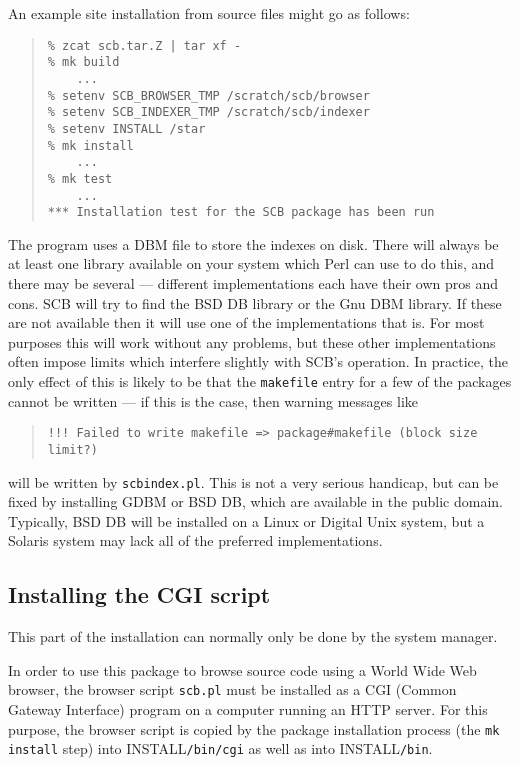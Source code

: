 \documentclass[twoside,11pt]{article}
\newcommand{\xlabel}[1]{}
\renewcommand{\_}{\texttt{\symbol{95}}}
\begin{document}
An example site installation from source files might go as follows:
\begin{quote}
\begin{verbatim}
% zcat scb.tar.Z | tar xf -
% mk build
    ...
% setenv SCB_BROWSER_TMP /scratch/scb/browser
% setenv SCB_INDEXER_TMP /scratch/scb/indexer
% setenv INSTALL /star
% mk install
    ...
% mk test
    ...
*** Installation test for the SCB package has been run
\end{verbatim}
\end{quote}

The program uses a DBM file to store the indexes on disk.
There will always be at least one library available on your system
which Perl can use to do this, and there may be
several --- different implementations each have their own pros and cons.
SCB will try to find
the BSD DB library or the Gnu DBM library.
If these are not available then it will use one of the implementations
that is.  For most purposes this will work without any problems, but
these other implementations often impose limits which interfere slightly
with SCB's operation.
In practice, the only effect of this is likely to be that the
{\tt makefile} entry for a few of the packages cannot be written ---
if this is the case, then warning messages like
\begin{quote}
\begin{verbatim}
!!! Failed to write makefile => package#makefile (block size limit?)
\end{verbatim}
\end{quote}
will be written by {\tt scbindex.pl}.
This is not a very serious handicap, but can be fixed by
installing GDBM or BSD DB, which are available in the public domain.
Typically, BSD DB will be installed on a Linux or Digital Unix system,
but a Solaris system may lack all of the preferred implementations.


\subsection{\xlabel{sec:install-cgi}\label{sec:install-cgi}Installing the CGI script}

This part of the installation can normally only be done by
the system manager.

In order to use this package to browse source code using a
World Wide Web browser, the browser script {\tt scb.pl}
must be installed as a CGI (Common Gateway Interface) program
on a computer running an HTTP server.
For this purpose, the browser script is copied by the package
installation process (the {\tt mk install} step)
into INSTALL{\tt /bin/cgi} as well as into INSTALL{\tt /bin}.
\end{document}

